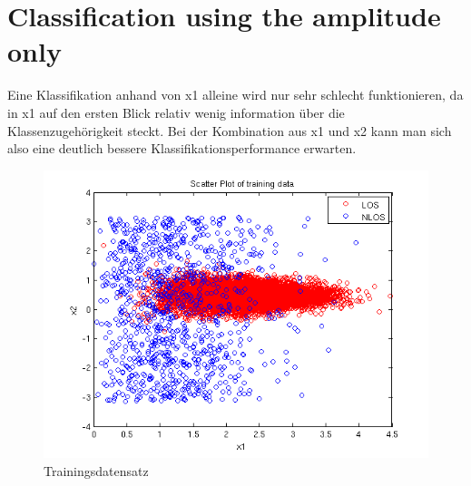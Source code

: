 \section{Classification using the amplitude only}

Eine Klassifikation anhand von x1 alleine wird nur sehr schlecht funktionieren, da in 
x1 auf den ersten Blick relativ wenig information über die Klassenzugehörigkeit steckt.
Bei der Kombination aus x1 und x2 kann man sich also eine deutlich bessere Klassifikationsperformance erwarten.


\begin{figure}[ht!]
 \centering
 \includegraphics[bb=0 0 449 336]{./figures/5_1_1_trainingdata.png}
 \caption{Trainingsdatensatz}
 \label{abb:trainingdata}
\end{figure}

